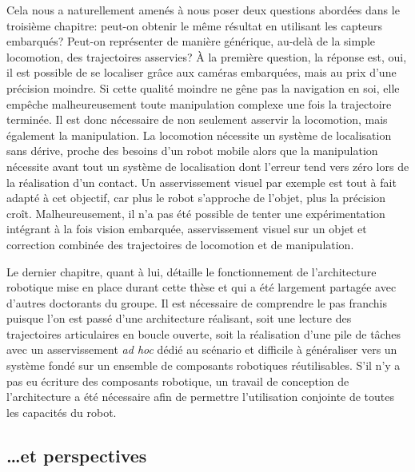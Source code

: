 Cela nous a naturellement amenés à nous poser deux questions abordées
dans le troisième chapitre: peut-on obtenir le même résultat en
utilisant les capteurs embarqués? Peut-on représenter de manière
générique, au-delà de la simple locomotion, des trajectoires
asservies? À la première question, la réponse est, oui, il est
possible de se localiser grâce aux caméras embarquées, mais au prix
d'une précision moindre. Si cette qualité moindre ne gêne pas la
navigation en soi, elle empêche malheureusement toute manipulation
complexe une fois la trajectoire terminée. Il est donc nécessaire de
non seulement asservir la locomotion, mais également la manipulation. La
locomotion nécessite un système de localisation sans dérive, proche
des besoins d'un robot mobile alors que la manipulation nécessite avant
tout un système de localisation dont l'erreur tend vers zéro lors de
la réalisation d'un contact. Un asservissement visuel par exemple est
tout à fait adapté à cet objectif, car plus le robot s'approche de
l'objet, plus la précision croît. Malheureusement, il n'a pas été
possible de tenter une expérimentation intégrant à la fois vision
embarquée, asservissement visuel sur un objet et correction combinée
des trajectoires de locomotion et de manipulation.


Le dernier chapitre, quant à lui, détaille le fonctionnement de
l'architecture robotique mise en place durant cette thèse et qui a été
largement partagée avec d'autres doctorants du groupe. Il est
nécessaire de comprendre le pas franchis puisque l'on est passé d'une
architecture réalisant, soit une lecture des trajectoires articulaires
en boucle ouverte, soit la réalisation d'une pile de tâches avec un
asservissement \emph{ad hoc} dédié au scénario et difficile à
généraliser vers un système fondé sur un ensemble de composants
robotiques réutilisables. S'il n'y a pas eu écriture des composants
robotique, un travail de conception de l'architecture a été nécessaire
afin de permettre l'utilisation conjointe de toutes les capacités du
robot.



\subsection{\ldots et perspectives}



